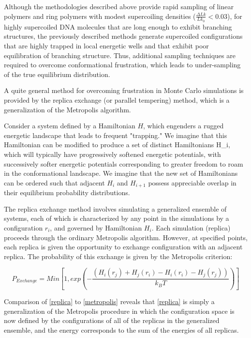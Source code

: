 \documentclass[english]{article}
\begin{document}
Although the methodologies described above provide rapid sampling of linear polymers and ring polymers with modest supercoiling densities ($\frac{\Delta Lk}{Lk_0}<0.03$), for highly supercoiled DNA molecules that are long enough to exhibit branching structures, the previously described methods generate supercoiled configurations that are highly trapped in local energetic wells and that exhibit poor equilibration of branching structure. Thus, additional sampling techniques are required to overcome conformational frustration, which leads to under-sampling of the true equilibrium distribution.

A quite general method for overcoming frustration in Monte Carlo simulations is provided by the replica exchange (or parallel tempering) method, which is a generalization of the Metropolis algorithm. 

Consider a system defined by a Hamiltonian $H$, which engenders a rugged energetic landscape that leads to frequent "trapping." We imagine that this Hamiltonian can be modified to produce a set of distinct Hamiltonians {H_i}, which will typically have progressively softened energetic potentials, with successively softer energetic potentials corresponding to greater freedom to roam in the conformational landscape. We imagine that the new set of Hamiltonians can be ordered such that adjacent $H_i$ and $H_{i+1}$ possess appreciable overlap in their equilibrium probability distributions.

The replica exchange method involves simulating a generalized ensemble of systems, each of which is characterized by any point in the simulations by a configuration ${r_i}$, and governed by  Hamiltonian $H_i$. Each simulation (replica) proceeds through the ordinary Metropolis algorithm. However, at specified points, each replica is given the opportunity to exchange configuration with an adjacent replica. The probability of this exchange is given by the Metropolis criterion:

\begin{equation}
P_{Exchange}=Min[1,exp(-\frac{(H_i(r_j)+H_j(r_i)-H_i(r_i)-H_j(r_j))}{k_BT})] \label{replica}
\end{equation}

Comparison of \eqref{replica} to \eqref{metropolis} reveals that \eqref{replica} is simply a generalization of the Metropolis procedure in which the configuration space is now defined by the configurations of all of the replicas in the generalized ensemble, and the energy corresponds to the sum of the energies of all replicas.
\end{document}
